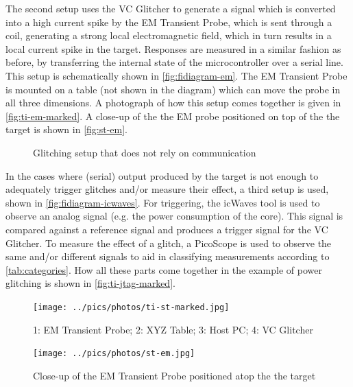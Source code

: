 \documentclass[10pt]{article}
\begin{document}
    \noindent The second setup uses the VC Glitcher to generate a signal which is converted into a high current spike by the EM Transient Probe, which is sent through a coil, generating a strong local electromagnetic field, which in turn results in a local current spike in the target. Responses are measured in a similar fashion as before, by transferring the internal state of the microcontroller over a serial line. This setup is schematically shown in \autoref{fig:fidiagram-em}. The EM Transient Probe is mounted on a table (not shown in the diagram) which can move the probe in all three dimensions. A photograph of how this setup comes together is given in \autoref{fig:ti-em-marked}. A close-up of the the EM probe positioned on top of the the target is shown in \autoref{fig:st-em}.

    \begin{figure}[H]
    \centering
    \def\svgwidth{\columnwidth}
    
    \caption{Glitching setup that does not rely on communication}
    \label{fig:fidiagram-icwaves}
    \end{figure}

    \noindent In the cases where (serial) output produced by the target is not enough to adequately trigger glitches and/or measure their effect, a third setup is used, shown in \autoref{fig:fidiagram-icwaves}. For triggering, the icWaves tool is used to observe an analog signal (e.g. the power consumption of the core). This signal is compared against a reference signal and produces a trigger signal for the VC Glitcher. To measure the effect of a glitch, a PicoScope is used to observe the same and/or different signals to aid in classifying measurements according to \autoref{tab:categories}. How all these parts come together in the example of power glitching is shown in \autoref{fig:ti-jtag-marked}.


    \begin{figure}[H]
      \centering
      \texttt{[image: ../pics/photos/ti-st-marked.jpg]}
      \caption{1: EM Transient Probe; 2: XYZ Table; 3: Host PC; 4: VC Glitcher}
      \label{fig:ti-em-marked}
    \end{figure}

    \begin{figure}[H]
      \centering
      \texttt{[image: ../pics/photos/st-em.jpg]}
      \caption{Close-up of the EM Transient Probe positioned atop the the target}
      \label{fig:st-em}
    \end{figure}
\end{document}
